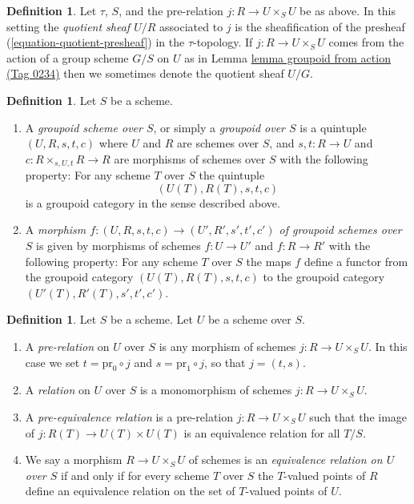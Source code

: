 \documentclass{amsart}
\theoremstyle{plain}
\theoremstyle{definition}
\newtheorem{definition}[subsection]{Definition}
\theoremstyle{remark}
\numberwithin{equation}{subsection}
\begin{document}
\begin{definition}
\label{definition-quotient-sheaf}
Let $\tau$, $S$, and the pre-relation $j : R \to U \times_S U$ be as above.
In this setting the {\it quotient sheaf $U/R$} associated
to $j$ is the sheafification of the presheaf
(\ref{equation-quotient-presheaf}) in the $\tau$-topology.
If $j : R \to U \times_S U$ comes from the action of a group scheme
$G/S$ on $U$ as in Lemma \href{https://stacks.math.columbia.edu/tag/0234}{lemma groupoid from action (Tag 0234)} then we
sometimes denote the quotient sheaf $U/G$.
\end{definition}

\begin{definition}
\label{definition-groupoid}
Let $S$ be a scheme.
\begin{enumerate}
\item A {\it groupoid scheme over $S$}, or simply a
{\it groupoid over $S$} is a
quintuple $(U, R, s, t, c)$ where
$U$ and $R$ are schemes over $S$, and
$s, t : R \to U$ and $c : R \times_{s, U, t} R \to R$
are morphisms of schemes over $S$ with the
following property: For any scheme
$T$ over $S$ the quintuple
$$
(U(T), R(T), s, t, c)
$$
is a groupoid category in the sense described above.
\item A {\it morphism
$f : (U, R, s, t, c) \to (U', R', s', t', c')$
of groupoid schemes over $S$} is given by morphisms
of schemes $f : U \to U'$ and $f : R \to R'$ with the
following property:  For any scheme
$T$ over $S$ the maps $f$ define a functor from the
groupoid category $(U(T), R(T), s, t, c)$ to the
groupoid category $(U'(T), R'(T), s', t', c')$.
\end{enumerate}
\end{definition}

\begin{definition}
\label{definition-equivalence-relation}
Let $S$ be a scheme. Let $U$ be a scheme over $S$.
\begin{enumerate}
\item A {\it pre-relation} on $U$ over $S$ is any morphism
of schemes $j : R \to U \times_S U$. In this case we set
$t = \text{pr}_0 \circ j$ and $s = \text{pr}_1 \circ j$, so
that $j = (t, s)$.
\item A {\it relation} on $U$ over $S$ is a monomorphism
of schemes $j : R \to U \times_S U$.
\item A {\it pre-equivalence relation} is a pre-relation
$j : R \to U \times_S U$ such that the image of
$j : R(T) \to U(T) \times U(T)$ is an equivalence relation for
all $T/S$.
\item We say a morphism $R \to U \times_S U$ of schemes is
an {\it equivalence relation on $U$ over $S$}
if and only if for every scheme $T$ over $S$ the $T$-valued
points of $R$ define an equivalence relation
on the set of $T$-valued points of $U$.
\end{enumerate}
\end{definition}
\end{document}
